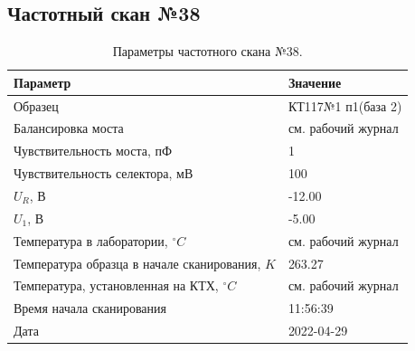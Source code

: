 \subsection{Частотный скан №38}
\begin{table}[!ht]
    \centering
    \caption{Параметры частотного скана №38.}
    \begin{tabular}{|l|l|}
        \hline
        Параметр                                       & Значение                  \\ \hline
        Образец                                        & КТ117№1 п1(база 2)        \\ \hline
        Балансировка моста                             & см. рабочий журнал        \\ \hline
        Чувствительность моста, пФ                     & 1                         \\ \hline
        Чувствительность селектора, мВ                 & 100                       \\ \hline
        $U_R$, В                                       & -12.00                    \\ \hline
        $U_1$, В                                       & -5.00                     \\ \hline
        Температура в лаборатории, $^\circ C$          & см. рабочий журнал        \\ \hline
        Температура образца в начале сканирования, $K$ & 263.27                    \\ \hline
        Температура, установленная на КТХ, $^\circ C$  & см. рабочий журнал        \\ \hline
        Время начала сканирования                      & 11:56:39                  \\ \hline
        Дата                                           & 2022-04-29                \\ \hline
    \end{tabular}
    \label{table:frequency_scan_38}
\end{table}

